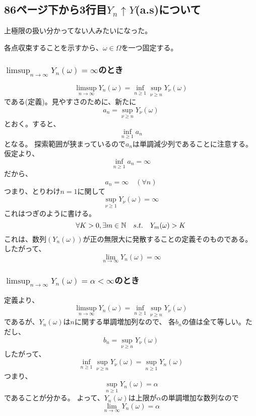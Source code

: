     \subsection{86ページ下から3行目$Y_n \uparrow Y$(a.s)について}
      上極限の扱い分かってない人みたいになった。

      各点収束することを示すから、$\omega \in \Omega$を一つ固定する。
      \subsubsection{$\limsup_{n \to \infty}{Y_n(\omega)} = \infty$のとき}
        \[
          \limsup_{n \to \infty}{Y_n(\omega)} = \inf_{n \ge 1} \sup_{\nu \ge n} Y_{\nu}(\omega)
        \]
        である(定義)。見やすさのために、新たに
        \[
          a_n = \sup_{\nu \ge n} Y_{\nu}(\omega)
        \]
        とおく。すると、
        \[
          \inf_{n \ge 1} a_n
        \]
        となる。
        探索範囲が狭まっているので$a_n$は単調減少列であることに注意する。
        仮定より、
        \[
          \inf_{n \ge 1} a_n = \infty
        \]
        だから、
        \[
          a_n = \infty \quad (\forall n)
        \]
        つまり、とりわけ$n=1$に関して
        \[
          \sup_{\nu \ge 1} Y_{\nu}(\omega) = \infty
        \]
        これはつぎのように書ける。
        \[
          \forall K >0 , \exists m \in {\mathbb{N}} \quad s.t. \quad Y_m(\omega) > K
        \]
        これは、数列$(Y_n(\omega))$が正の無限大に発散することの定義そのものである。
        したがって、
        \[
          \lim_{n \to \infty} Y_n(\omega) = \infty
        \]

      \subsubsection{$\limsup_{n \to \infty}{Y_n(\omega)} = \alpha < \infty$のとき}
        定義より、
        \[
          \limsup_{n \to \infty}{Y_n(\omega)} = \inf_{n \ge 1} \sup_{\nu \ge n} Y_{\nu}(\omega)
        \]
        であるが、$Y_{n}(\omega)$は$n$に関する単調増加列なので、
        各$b_n$の値は全て等しい。ただし、
        \[
          b_n = \sup_{\nu \ge n} Y_{\nu}(\omega)
        \]
        したがって、
        \[
          \inf_{n \ge 1} \sup_{\nu \ge n} Y_{\nu}(\omega) = \sup_{n \ge 1}Y_n(\omega)
        \]
        つまり、
        \[
          \sup_{n \ge 1}Y_n(\omega) = \alpha
        \]
        であることが分かる。
        よって、$Y_n(\omega)$は上限が$\alpha$の単調増加な数列なので
        \[
          \lim_{n \to \infty}Y_n(\omega) = \alpha
        \]

